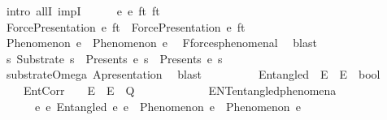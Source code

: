 \begin{isabellebody}
\ {\isacharparenleft}{\kern0pt}intro\ allI\ impI{\isacharparenright}{\kern0pt}\isanewline
\ \ \ \ \isamarkupfalse%
\ e{}\ e{}\ ft{}\ ft{}\isanewline
\ \ \ \ \isamarkupfalse%
\ {\isachardoublequoteopen}ForcePresentation\ e{}\ ft{}\ {\isasymand}\ ForcePresentation\ e{}\ ft{}{\isachardoublequoteclose}\isanewline
\ \ \ \ \isamarkupfalse%
\ {\isachardoublequoteopen}Phenomenon\ e{}\ {\isasymand}\ Phenomenon\ e{}{\isachardoublequoteclose}\ \isamarkupfalse%
\ F{}{\isacharunderscore}{\kern0pt}forces{\isacharunderscore}{\kern0pt}phenomenal\ \isamarkupfalse%
\ blast\isanewline
\ \ \ \ \isamarkupfalse%
\ {\isachardoublequoteopen}{\isacharparenleft}{\kern0pt}{\isasymexists}s{\isachardot}{\kern0pt}\ Substrate\ s\ {\isasymand}\ Presents\ e{}\ s\ {\isasymand}\ Presents\ e{}\ s{\isacharparenright}{\kern0pt}{\isachardoublequoteclose}\isanewline
\ \ \ \ \ \ \isamarkupfalse%
\ substrate{\isacharunderscore}{\kern0pt}Omega\ A{}{\isacharunderscore}{\kern0pt}presentation\ \isamarkupfalse%
\ blast\isanewline
\ \ \isamarkupfalse%
%
\endisatagproof
{\isafoldproof}%
%
\isadelimproof
%
\endisadelimproof
%
\isadelimdocument
%
\endisadelimdocument
%
\isatagdocument
%
\isamarkuptrue%
%
\endisatagdocument
{\isafolddocument}%
%
\isadelimdocument
%
\endisadelimdocument
\ \ \isamarkupfalse%
\isanewline
\ \ \ \ Entangled\ {\isacharcolon}{\kern0pt}{\isacharcolon}{\kern0pt}\ {\isachardoublequoteopen}E\ {\isasymRightarrow}\ E\ {\isasymRightarrow}\ bool{\isachardoublequoteclose}\ \ \isanewline
\ \ \ \ EntCorr\ \ \ {\isacharcolon}{\kern0pt}{\isacharcolon}{\kern0pt}\ {\isachardoublequoteopen}E\ {\isasymRightarrow}\ E\ {\isasymRightarrow}\ Q{\isachardoublequoteclose}\ \ \ \ \isanewline
\isanewline
\ \ \isamarkupfalse%
\ \isanewline
\ \ \ \ ENT{}{\isacharunderscore}{\kern0pt}entangled{\isacharunderscore}{\kern0pt}phenomena{\isacharcolon}{\kern0pt}\isanewline
\ \ \ \ \ \ {\isachardoublequoteopen}{\isasymforall}e{}\ e{}{\isachardot}{\kern0pt}\ Entangled\ e{}\ e{}\ {\isasymlongrightarrow}\ Phenomenon\ e{}\ {\isasymand}\ Phenomenon\ e{}{\isachardoublequoteclose}\ \isanewline

\end{isabellebody}
